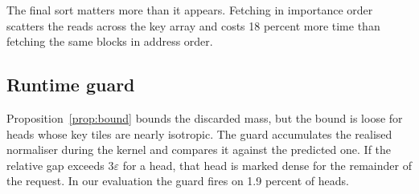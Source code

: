 The final sort matters more than it appears. Fetching in importance order
scatters the reads across the key array and costs 18 percent more time than
fetching the same blocks in address order.

\subsection{Runtime guard}

Proposition~\ref{prop:bound} bounds the discarded mass, but the bound is loose
for heads whose key tiles are nearly isotropic. The guard accumulates the
realised normaliser during the kernel and compares it against the predicted
one. If the relative gap exceeds $3\varepsilon$ for a head, that head is marked
dense for the remainder of the request. In our evaluation the guard fires on
1.9 percent of heads.
